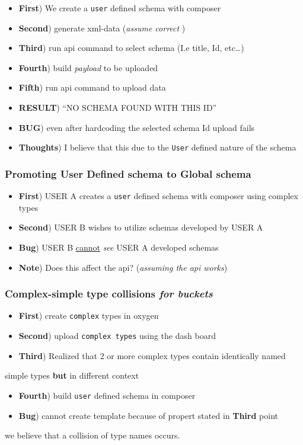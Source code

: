 \documentclass[11pt]{article}
\begin{document}
\begin{itemize}
\item \textbf{First}) We create a \verb~user~ defined schema with composer
\item \textbf{Second}) generate xml-data (\emph{assume correct} )
\item \textbf{Third}) run api command to select schema (I.e title, Id, etc\ldots{})
\item \textbf{Fourth}) build \emph{payload} to be uploaded
\item \textbf{Fifth}) run api command to upload data
\item \textbf{RESULT}) ``NO SCHEMA FOUND WITH THIS ID''
\item \textbf{BUG}) even after hardcoding the selected schema Id upload fails
\item \textbf{Thoughts}) I believe that this due to the \verb~User~ defined nature of the
 schema
\end{itemize}
\subsubsection{Promoting User Defined schema to Global schema}
\label{sec-1-2-3}

\begin{itemize}
\item \textbf{First}) USER A creates a \verb~user~ defined schema with composer using complex types
\item \textbf{Second}) USER B wishes to utilize schemas developed by USER A
\item \textbf{Bug}) USER B \underline{cannot} \emph{see} USER A developed schemas
\item \textbf{Note}) Does this affect the api? (\emph{assuming the api works})
\end{itemize}
\subsubsection{Complex-simple type collisions \emph{for buckets}}
\label{sec-1-2-4}

\begin{itemize}
\item \textbf{First}) create \verb~complex~ types in oxygen
\item \textbf{Second}) upload \verb~complex types~ using the dash board
\item \textbf{Third}) Realized that 2 or more complex types contain identically named
\end{itemize}
simple types \textbf{but} in different context
\begin{itemize}
\item \textbf{Fourth}) build \verb~user~ defined schema in composer
\item \textbf{Bug}) cannot create template because of propert stated in \textbf{Third} point
\end{itemize}
we believe that a collision of type names occurs.
\end{document}
